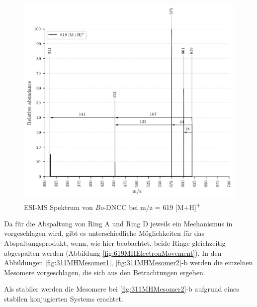 \begin{figure}[!htbp]
  \centering
  \includegraphics[width=\textwidth, height=0.7\textwidth]{figures/Kapitel7/Kataboliten/VWA_MS_619.png}
  \caption[ESI-MS Spektrum von \textit{Bo}-DNCC, Quelle: Autor]{ESI-MS Spektrum von \textit{Bo}-DNCC bei m/z = 619 [M+H]\textsuperscript{+}}
  \label{fig:619MH}
\end{figure}

Da für die Abspaltung von Ring A und Ring D jeweils ein Mechanismus in \cite{StructureElucidation} vorgeschlagen wird, gibt es unterschiedliche Möglichkeiten für das Abspaltungsprodukt, wenn, wie hier beobachtet, beide Ringe gleichzeitig abgespalten werden (Abbildung \ref{fig:619MHElectronMovement}). In den Abbildungen \ref{fig:311MHMesomer1}, \ref{fig:311MHMesomer2}-b werden die einzelnen Mesomere vorgeschlagen, die sich aus den Betrachtungen ergeben. 

Als stabiler werden die Mesomere bei \ref{fig:311MHMesomer2}-b aufgrund eines stabilen konjugierten Systems erachtet.

